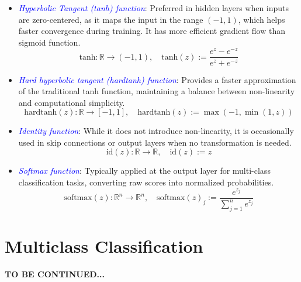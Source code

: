 \begin{example}
\begin{itemize}
    \item \textcolor{blue}{\emph{Hyperbolic Tangent (tanh) function}}: Preferred in hidden layers when inputs are zero-centered, as it maps the input in the range $(-1, 1)$, which helps faster convergence during training. It has more efficient gradient flow than sigmoid function.
    \begin{equation}
        \text{tanh}: \mathbb{R} \to (-1,1), \quad \text{tanh}(z) := \frac{e^z-e^{-z}}{e^z+e^{-z}}
        \label{eqn:35}
    \end{equation}
    
    \item \textcolor{blue}{\emph{Hard hyperbolic tangent (hardtanh) function}}: Provides a faster approximation of the traditional tanh function, maintaining a balance between non-linearity and computational simplicity.
    \begin{equation}
        \text{hardtanh}(z): \mathbb{R} \to [-1,1], \quad \text{hardtanh}(z) := \max(-1, \min(1,z))
        \label{eqn:36}
    \end{equation}
    
    \item \textcolor{blue}{\emph{Identity function}}: While it does not introduce non-linearity, it is occasionally used in skip connections or output layers when no transformation is needed.
    \begin{equation}
        \text{id}(z): \mathbb{R} \to \mathbb{R}, \quad \text{id}(z) := z
        \label{eqn:37}
    \end{equation}
    
    \item \textcolor{blue}{\emph{Softmax function}}: Typically applied at the output layer for multi-class classification tasks, converting raw scores into normalized probabilities.
    \begin{equation}
        \text{softmax}(z) : \mathbb{R}^n \to \mathbb{R}^n, \quad \text{softmax}(z)_j := \frac{e^{z_j}}{\sum_{j=1}^n e^{z_j}}
        \label{eqn:38}
    \end{equation}
\end{itemize}

\end{example}

\section{Multiclass Classification}

\vspace{5em}
\textbf{TO BE CONTINUED...}


